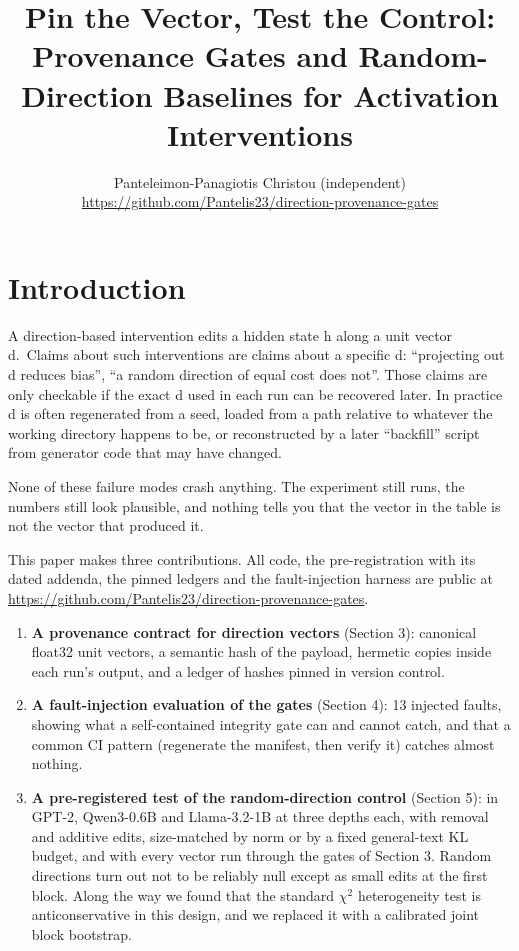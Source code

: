 \documentclass[
  10pt,
]{article}
\title{Pin the Vector, Test the Control: Provenance Gates and
Random-Direction Baselines for Activation Interventions}
\author{Panteleimon-Panagiotis Christou (independent)\\ \small\url{https://github.com/Pantelis23/direction-provenance-gates}}
\date{}
\providecommand{\tightlist}{%
  \setlength{\itemsep}{0pt}\setlength{\parskip}{0pt}}
\begin{document}
\maketitle
\begin{abstract}

\end{abstract}

\section{Introduction}\label{introduction}

A direction-based intervention edits a hidden state h along a unit
vector d.~Claims about such interventions are claims about a specific d:
``projecting out d reduces bias'', ``a random direction of equal cost
does not''. Those claims are only checkable if the exact d used in each
run can be recovered later. In practice d is often regenerated from a
seed, loaded from a path relative to whatever the working directory
happens to be, or reconstructed by a later ``backfill'' script from
generator code that may have changed.

None of these failure modes crash anything. The experiment still runs,
the numbers still look plausible, and nothing tells you that the vector
in the table is not the vector that produced it.

This paper makes three contributions. All code, the pre-registration
with its dated addenda, the pinned ledgers and the fault-injection
harness are public at
\url{https://github.com/Pantelis23/direction-provenance-gates}.

\begin{enumerate}
\def\labelenumi{\arabic{enumi}.}
\tightlist
\item
  \textbf{A provenance contract for direction vectors} (Section 3):
  canonical float32 unit vectors, a semantic hash of the payload,
  hermetic copies inside each run's output, and a ledger of hashes
  pinned in version control.
\item
  \textbf{A fault-injection evaluation of the gates} (Section 4): 13
  injected faults, showing what a self-contained integrity gate can and
  cannot catch, and that a common CI pattern (regenerate the manifest,
  then verify it) catches almost nothing.
\item
  \textbf{A pre-registered test of the random-direction control}
  (Section 5): in GPT-2, Qwen3-0.6B and Llama-3.2-1B at three depths
  each, with removal and additive edits, size-matched by norm or by a
  fixed general-text KL budget, and with every vector run through the
  gates of Section 3. Random directions turn out not to be reliably null
  except as small edits at the first block. Along the way we found that
  the standard $\chi^2$ heterogeneity test is anticonservative in this design,
  and we replaced it with a calibrated joint block bootstrap.
\end{enumerate}
\end{document}
